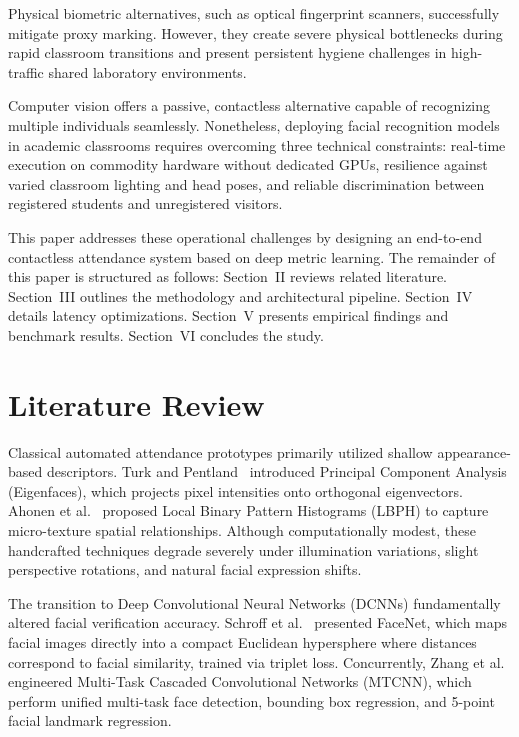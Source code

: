 \documentclass[conference]{IEEEtran}
\begin{document}
Physical biometric alternatives, such as optical fingerprint scanners, successfully mitigate proxy marking. However, they create severe physical bottlenecks during rapid classroom transitions and present persistent hygiene challenges in high-traffic shared laboratory environments.

Computer vision offers a passive, contactless alternative capable of recognizing multiple individuals seamlessly. Nonetheless, deploying facial recognition models in academic classrooms requires overcoming three technical constraints: real-time execution on commodity hardware without dedicated GPUs, resilience against varied classroom lighting and head poses, and reliable discrimination between registered students and unregistered visitors.

This paper addresses these operational challenges by designing an end-to-end contactless attendance system based on deep metric learning. The remainder of this paper is structured as follows: Section~II reviews related literature. Section~III outlines the methodology and architectural pipeline. Section~IV details latency optimizations. Section~V presents empirical findings and benchmark results. Section~VI concludes the study.

\section{Literature Review}
Classical automated attendance prototypes primarily utilized shallow appearance-based descriptors. Turk and Pentland~\cite{turk1991eigenfaces} introduced Principal Component Analysis (Eigenfaces), which projects pixel intensities onto orthogonal eigenvectors. Ahonen et al.~\cite{ahonen2006face} proposed Local Binary Pattern Histograms (LBPH) to capture micro-texture spatial relationships. Although computationally modest, these handcrafted techniques degrade severely under illumination variations, slight perspective rotations, and natural facial expression shifts.

The transition to Deep Convolutional Neural Networks (DCNNs) fundamentally altered facial verification accuracy. Schroff et al.~\cite{schroff2015facenet} presented FaceNet, which maps facial images directly into a compact Euclidean hypersphere where distances correspond to facial similarity, trained via triplet loss. Concurrently, Zhang et al.~\cite{zhang2016joint} engineered Multi-Task Cascaded Convolutional Networks (MTCNN), which perform unified multi-task face detection, bounding box regression, and 5-point facial landmark regression.
\end{document}
